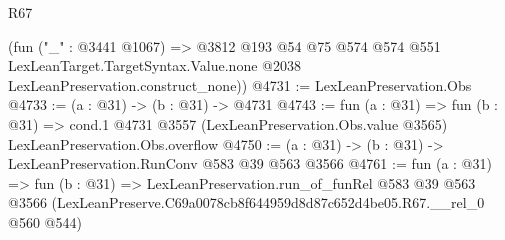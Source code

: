 \begin{lexlean}{R67}
\begin{coremodule}
      (fun ("_" : @3441 @1067) =>
      @3812
        @193
        @54
        @75
        @574
        @574
        @551
        LexLeanTarget.TargetSyntax.Value.none
        @2038
        LexLeanPreservation.construct_none))
@4731 := LexLeanPreservation.Obs
@4733 := (a : @31) -> (b : @31) -> @4731
@4743 := fun (a : @31) =>
  fun (b : @31) =>
  cond.{1} @4731 @3557 (LexLeanPreservation.Obs.value @3565) LexLeanPreservation.Obs.overflow
@4750 := (a : @31) -> (b : @31) -> LexLeanPreservation.RunConv @583 @39 @563 @3566
@4761 := fun (a : @31) =>
  fun (b : @31) =>
  LexLeanPreservation.run_of_funRel
    @583
    @39
    @563
    @3566
    (LexLeanPreserve.C69a0078cb8f644959d8d87c652d4be05.R67.__rel_0 @560 @544)
\end{coremodule}
\end{lexlean}
